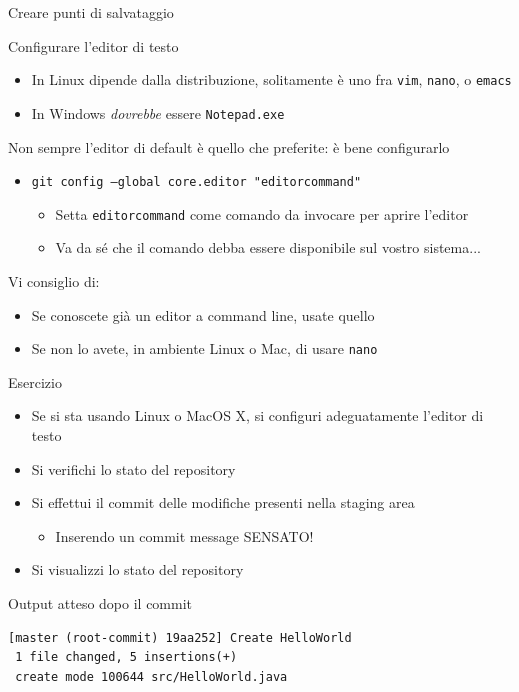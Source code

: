 \documentclass[presentation]{beamer}
\begin{document}
\begin{frame}{Creare punti di salvataggio}
\begin{block}{Configurare l'editor di testo}
\begin{itemize}
			\item In Linux dipende dalla distribuzione, solitamente è uno fra \texttt{vim}, \texttt{nano}, o \texttt{emacs}
			\item In Windows \textit{dovrebbe} essere \texttt{Notepad.exe}
		\end{itemize}
		Non sempre l'editor di default è quello che preferite: è bene configurarlo
		\begin{itemize}
			\item \texttt{git config --global core.editor "editorcommand"}
			\begin{itemize}
				\item Setta \texttt{editorcommand} come comando da invocare per aprire l'editor
				\item Va da sé che il comando debba essere disponibile sul vostro sistema...
			\end{itemize}
		\end{itemize}
		Vi consiglio di:
		\begin{itemize}
			\item Se conoscete già un editor a command line, usate quello
			\item Se non lo avete, in ambiente Linux o Mac, di usare \texttt{nano}
		\end{itemize}
	\end{block}
	\begin{block}{Esercizio}	
		\begin{itemize}
			\item Se si sta usando Linux o MacOS X, si configuri adeguatamente l'editor di testo
			\item Si verifichi lo stato del repository
			\item Si effettui il commit delle modifiche presenti nella staging area
			\begin{itemize}
				\item Inserendo un commit message SENSATO!
			\end{itemize}
			\item Si visualizzi lo stato del repository
		\end{itemize}
	\end{block}
	\begin{block}{Output atteso dopo il commit}
		\begin{Verbatim}[fontsize=\scriptsize]
[master (root-commit) 19aa252] Create HelloWorld
 1 file changed, 5 insertions(+)
 create mode 100644 src/HelloWorld.java
\end{Verbatim}
	\end{block}

\end{frame}
\end{document}
